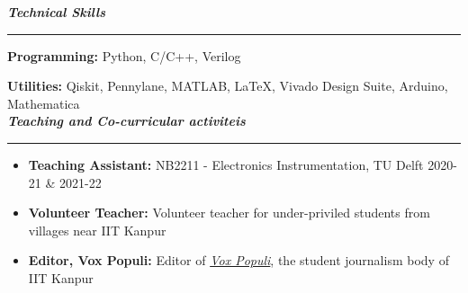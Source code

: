 \documentclass[11pt,a4paper]{article}
\begin{document}
\color{myBlue}
\noindent \Large\textbf{\textit{Technical Skills}} \vspace{0.15cm}
\hrule \normalsize
\color{black} \vspace{0.3cm}
\textbf{Programming:} Python, C/C++, Verilog

\textbf{Utilities:} Qiskit, Pennylane, MATLAB, \LaTeX, Vivado Design Suite, Arduino, Mathematica \\

\color{myBlue}
\noindent \Large\textbf{\textit{Teaching and Co-curricular activiteis}} \vspace{0.15cm}
\hrule \normalsize
\color{black} \vspace{0.3cm}
\begin{itemize}
  \item \textbf{Teaching Assistant:} NB2211 - Electronics Instrumentation, TU Delft \hfill 2020-21 \& 2021-22\vspace{-0.17cm}
  \item \textbf{Volunteer Teacher:} Volunteer teacher for under-priviled students from villages near IIT Kanpur \vspace{-0.17cm}
  \item \textbf{Editor, Vox Populi:} Editor of \href{https://voxiitk.com/}{\textit{Vox Populi}}, the student journalism body of IIT Kanpur
\end{itemize}
\end{document}
